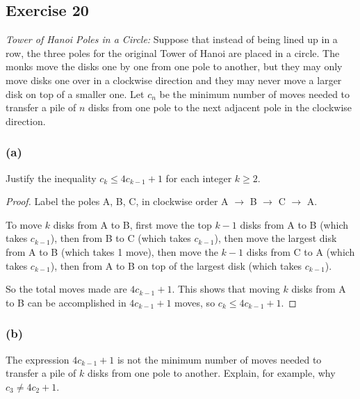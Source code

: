 \documentclass[14pt]{extarticle}
\begin{document}
\subsection{Exercise 20}
{\it Tower of Hanoi Poles in a Circle:} Suppose that instead of being lined up in a row, the three poles for the
original Tower of Hanoi are placed in a circle. The monks move the disks one by one from one pole to another, but
they may only move disks one over in a clockwise direction and they may never move a larger disk on top of a smaller
one. Let $c_n$ be the minimum number of moves needed to transfer a pile of $n$ disks from one pole to the next
adjacent pole in the clockwise direction.

\subsubsection{(a)}
Justify the inequality $c_k \leq 4c_{k - 1} + 1$ for each integer $k \geq 2$.

\begin{proof}
    Label the poles A, B, C, in clockwise order A $\to$ B $\to$ C $\to$ A.

    To move $k$ disks from A to B, first move the top $k-1$ disks from A to B (which takes $c_{k-1}$), then from B to C
    (which takes $c_{k-1}$), then move the largest disk from A to B (which takes 1 move), then move the $k-1$ disks from C
    to A (which takes $c_{k-1}$), then from A to B on top of the largest disk (which takes $c_{k-1}$).

    So the total moves made are $4c_{k-1} + 1$. This shows that moving $k$ disks from A to B can be accomplished in
    $4c_{k-1} + 1$ moves, so $c_k \leq 4c_{k-1} + 1$.
\end{proof}

\subsubsection{(b)}
The expression $4c_{k - 1} + 1$ is not the minimum number of moves needed to transfer a pile of $k$ disks from one
pole to another. Explain, for example, why $c_3 \neq 4c_2 + 1$.
\end{document}

